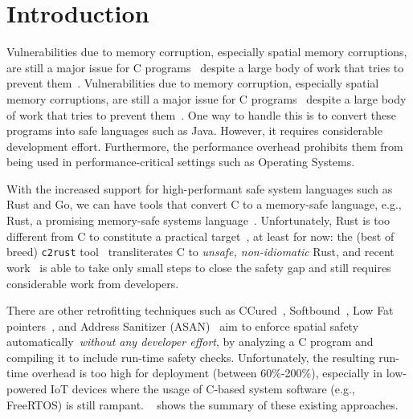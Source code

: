 \section{Introduction}
Vulnerabilities due to memory corruption, especially spatial memory corruptions, are still a major issue for C programs~\cite{cvetrend, microsoftmemsafe} despite a large body of work that tries
to prevent them~\cite{song2019sanitizing}.
Vulnerabilities due to memory corruption, especially spatial memory corruptions, are still a major issue for C programs~\cite{cvetrend, microsoftmemsafe} despite a large body of work that tries
to prevent them~\cite{song2019sanitizing}.
One way to handle this is to convert these programs into safe languages such as Java. However, it requires considerable development effort. Furthermore, the performance overhead prohibits them from being used in performance-critical settings such as Operating Systems.

With the increased support for high-performant safe system languages such as Rust and Go, we can have tools that convert C to a memory-safe language, e.g., Rust, a promising memory-safe systems
language~\cite{rustlang}. Unfortunately, Rust is too different from C to constitute a practical target~\cite{zeng2019identifying}, at least for now: the (best of breed) \texttt{c2rust} tool~\cite{c2rust,c2rusttalk} transliterates C to \emph{unsafe, non-idiomatic} Rust, and recent
work~\cite{emre2021c2rust} is able to take only small steps to close the safety gap and still requires considerable work from developers.

There are other retrofitting techniques such as CCured~\cite{necula2005ccured},
Softbound~\cite{nagarakatte2009softbound}, Low Fat
pointers~\cite{duck2016heap}, and Address Sanitizer
(ASAN)~\cite{serebryany2012addresssanitizer} aim to enforce spatial safety
automatically~\emph{without any developer effort}, by analyzing a C program and compiling it to include
run-time safety checks. Unfortunately, the resulting run-time overhead is too high
for deployment (between 60\%-200\%), especially in low-powered IoT devices where the usage of C-based system software (e.g., FreeRTOS) is still rampant.
~ shows the summary of these existing approaches.



